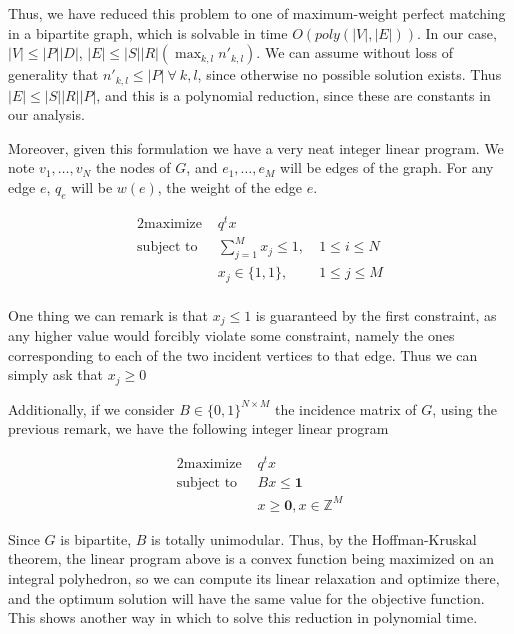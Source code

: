 Thus, we have reduced this problem to one of maximum-weight perfect matching in a bipartite graph, which is solvable in time $O(poly(|V|, |E|))$. In our case, $|V| \le |P||D|$, $|E| \le |S||R|(\max_{k, l} n'_{k, l})$. We can assume without loss of generality that $n'_{k, l} \le |P|\ \forall\ k, l$, since otherwise no possible solution exists. Thus $|E| \le |S||R||P|$, and this is a polynomial reduction, since these are constants in our analysis.

Moreover, given this formulation we have a very neat integer linear program. We note $v_1, \dots, v_N$ the nodes of $G$, and $e_1, \dots, e_M$ will be edges of the graph. For any edge $e$, $q_e$ will be $w(e)$, the weight of the edge $e$.

\begin{alignat*}{2}
  \text{maximize }   & q^t x \\
  \text{subject to } & \sum_{j=1}^M x_j \le 1, \ & 1 \le i \le N\\
                     & x_j \in \{1, 1\}, \ & 1 \le j \le M\\
\end{alignat*}

One thing we can remark is that $x_j \le 1$ is guaranteed by the first constraint, as any higher value would forcibly violate some constraint, namely the ones corresponding to each of the two incident vertices to that edge. Thus we can simply ask that $x_j \ge 0$

Additionally, if we consider $B \in \{0, 1\}^{N \times M}$ the incidence matrix of $G$, using the previous remark, we have the following integer linear program

\begin{alignat*}{2}
  \text{maximize } & q^t x \\
  \text{subject to } & Bx \le \mathbf{1}\\
                     & x \ge \mathbf{0}, x \in \mathbb{Z}^M
\end{alignat*}

Since $G$ is bipartite, $B$ is totally unimodular. Thus, by the Hoffman-Kruskal theorem, the linear program above is a convex function being maximized on an integral polyhedron, so we can compute its linear relaxation and optimize there, and the optimum solution will have the same value for the objective function. This shows another way in which to solve this reduction in polynomial time.
